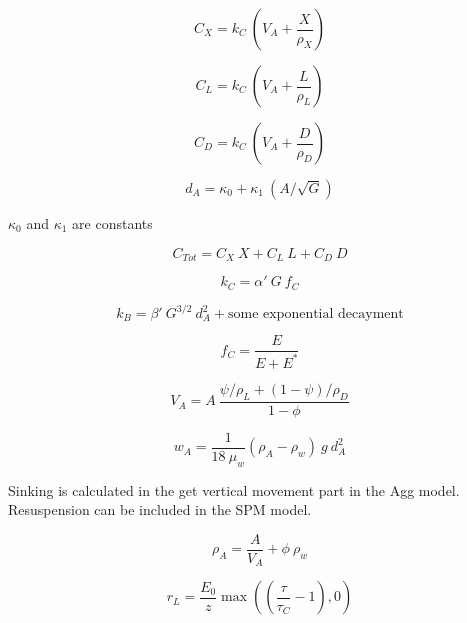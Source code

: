 \documentclass[fleqn]{article}                     %
\begin{document}
\begin{equation}
  C_X = k_C\ \left(V_A+\frac{X}{\rho_X}\right)
\end{equation}

\begin{equation}
  C_L = k_C\ \left(V_A+\frac{L}{\rho_L}\right)
\end{equation}

\begin{equation}
  C_D = k_C\ \left(V_A+\frac{D}{\rho_D}\right)
\end{equation}

\begin{equation}
  d_A = \kappa_0 + \kappa_1\ (A/\sqrt{G})
\end{equation}

$\kappa_0$ and $\kappa_1$ are constants

\begin{equation}
  C_{Tot} = C_X\ X + C_L\ L + C_D\ D
\end{equation}

\begin{equation}
  k_C = \alpha'\ G \ f_C
\end{equation}

\begin{equation}
  k_B = \beta'\ G^{3/2}\ d_A^2 + \textrm{some exponential decayment}
\end{equation}

\begin{equation}
  f_C = \frac{E}{E+E^*}
\end{equation}

\begin{equation}
  V_A = A\  \frac{\psi/ \rho_L + (1-\psi)/ \rho_D}{1-\phi}
\end{equation}

\begin{equation}
  w_A = \frac{1}{18\ \mu_w} (\rho_A-\rho_w)\ g\ d_A^2
\end{equation}

Sinking is calculated in the  get vertical movement part in the Agg model.
Resuspension can be included in the SPM model.

\begin{equation}
  \rho_A = \frac{A}{V_A}+\phi\ \rho_w
\end{equation}

\begin{equation}
r_L = \frac{E_0}{z}\max \left( (\frac{\tau}{\tau_C}-1) ,0 \right)
\end{equation}
\end{document}
